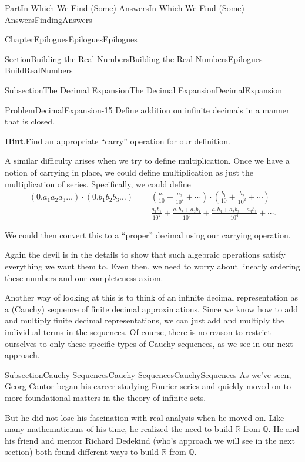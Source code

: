 \documentclass[oneside,10pt,]{book}
\newcommand{\blocktitlefont}{\relax}
\numberwithin{equation}{part}
\newcommand{\RR}{\mathbb {R}}
\newcommand{\QQ}{\mathbb {Q}}
\newcommand{\amp}{&}
\begin{document}
\begin{partptx}{Part}{In Which We Find (Some) Answers}{}{In Which We Find (Some) Answers}{}{}{FindingAnswers}
\begin{chapterptx}{Chapter}{Epilogues}{}{Epilogues}{}{}{Epilogues}
\begin{sectionptx}{Section}{Building the Real Numbers}{}{Building the Real Numbers}{}{}{Epilogues-BuildRealNumbers}
\begin{subsectionptx}{Subsection}{The Decimal Expansion}{}{The Decimal Expansion}{}{}{DecimalExpansion}
\begin{problem}{Problem}{}{DecimalExpansion-15}
Define addition on infinite decimals in a manner that is closed.%
\par\smallskip%
\noindent\textbf{\blocktitlefont Hint}.\hypertarget{DecimalExpansion-15-3}{}\quad{}Find an appropriate ``carry'' operation for our definition.%
\end{problem}
A similar difficulty arises when we try to define multiplication.  Once we have a notion of carrying in place, we could define multiplication as just the multiplication of series.  Specifically, we could define%
\begin{align*}
(0.a_1a_2a_3\ldots)\cdot(0.b_1b_2b_3\ldots) \amp =\left(\frac{a_1}{10}+\frac{a_2}{10^2}+\cdots\right) \cdot\left(\frac{b_1}{10}+\frac{b_2}{10^2}+\cdots\right)\\
\amp =\frac{a_1b_1}{10^2}+\frac{a_1b_2+a_2b_1}{10^3}+\frac{a_1b_3+a_2b_2+a_3b_1}{10^4}+\cdots\text{.}
\end{align*}
%
\par
We could then convert this to a ``proper'' decimal using our carrying operation.%
\par
Again the devil is in the details to show that such algebraic operations satisfy everything we want them to. Even then, we need to worry about linearly ordering these numbers and our completeness axiom.%
\par
Another way of looking at this is to think of an infinite decimal representation as a (Cauchy) sequence of finite decimal approximations.  Since we know how to add and multiply finite decimal representations, we can just add and multiply the individual terms in the sequences.  Of course, there is no reason to restrict ourselves to only these specific types of Cauchy sequences, as we see in our next approach.%
\end{subsectionptx}
%
%
\typeout{************************************************}
\typeout{************************************************}
%
\begin{subsectionptx}{Subsection}{Cauchy Sequences}{}{Cauchy Sequences}{}{}{CauchySequences}
 As we've seen, Georg Cantor began his career studying Fourier series and quickly moved on to more foundational matters in the theory of infinite sets.%
\par
But he did not lose his fascination with real analysis when he moved on.  Like many mathematicians of his time, he realized the need to build \(\RR\) from \(\QQ\).  He and his friend and mentor Richard Dedekind  (who's approach we will see in the next section) both found different ways to build \(\RR\) from \(\QQ\).%

\end{subsectionptx}
\end{sectionptx}
\end{chapterptx}
\end{partptx}
\end{document}
